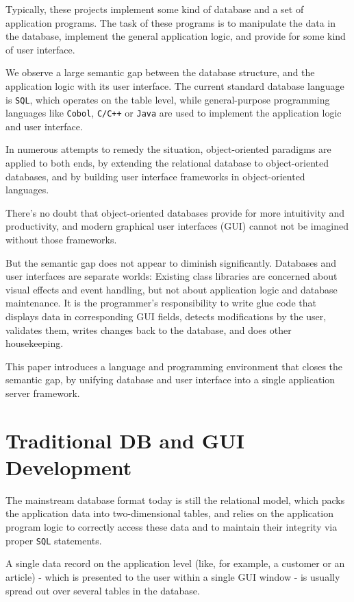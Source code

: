 Typically, these projects implement some kind of database and a set of
application programs. The task of these programs is to manipulate the
data in the database, implement the general application logic, and
provide for some kind of user interface.

We observe a large semantic gap between the database structure, and the
application logic with its user interface. The current standard database
language is \texttt{SQL}, which operates on the table level, while
general-purpose programming languages like \texttt{Cobol}, \texttt{C/C++} or \texttt{Java}
are used to implement the application logic and user interface.

In numerous attempts to remedy the situation, object-oriented paradigms
are applied to both ends, by extending the relational database to
object-oriented databases, and by building user interface frameworks in
object-oriented languages.

There's no doubt that object-oriented databases provide for more
intuitivity and productivity, and modern graphical user interfaces (GUI)
cannot not be imagined without those frameworks.

But the semantic gap does not appear to diminish significantly.
Databases and user interfaces are separate worlds: Existing class
libraries are concerned about visual effects and event handling, but not
about application logic and database maintenance. It is the programmer's
responsibility to write glue code that displays data in corresponding
GUI fields, detects modifications by the user, validates them, writes
changes back to the database, and does other housekeeping.

This paper introduces a language and programming environment that closes
the semantic gap, by unifying database and user interface into a single
application server framework.

 
\section{Traditional DB and GUI Development}
\label{sec:ul-trad-db-gui-devel}

The mainstream database format today is still the relational model,
which packs the application data into two-dimensional tables, and relies
on the application program logic to correctly access these data and to
maintain their integrity via proper \texttt{SQL} statements.

A single data record on the application level (like, for example, a
customer or an article) - which is presented to the user within a single
GUI window - is usually spread out over several tables in the database.

